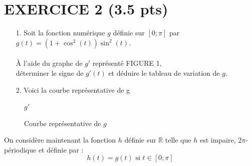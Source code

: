 \documentclass[12pt]{article}
\begin{document}
\newpage
\section*{EXERCICE 2 (3.5 pts) } %

\begin{multicols}{2}
  \begin{enumerate}
  \item[1.]
    Soit la fonction numérique $g$ définie sur $[0 ; \pi]$ par $g(t) = (1 + \cos^{2}(t)) \sin^{2}(t)$.\\ \vspace{0.5cm}\\
    À l'aide du graphe de $g'$ représenté FIGURE 1, \\
    déterminer le signe de $g'(t)$ et déduire le tableau de variation de $g$.

  \item[2.] Voici la courbe représentative de g
  
  \end{enumerate}

  \begin{figure}[H]
    \centering
    \caption{$g'$}
  \end{figure}
\end{multicols}

  \begin{figure}[H]
    \centering
    \caption{Courbe représentative de $g$}
  \end{figure}

  On considère maintenant la fonction $h$ définie sur $\mathbb{R}$ telle que $h$ est impaire, $2\pi$-périodique et définie par :
  $$h(t) = g(t) \text{ si } t \in [0 ; \pi ]$$
\end{document}
